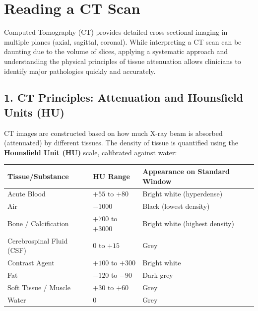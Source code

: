 \chapter{Reading a CT Scan}

\label{ch:read_ct}

Computed Tomography (CT) provides detailed cross-sectional imaging in multiple planes (axial, sagittal, coronal). While interpreting a CT scan can be daunting due to the volume of slices, applying a systematic approach and understanding the physical principles of tissue attenuation allows clinicians to identify major pathologies quickly and accurately.


\section*{1. CT Principles: Attenuation and Hounsfield Units (HU)}
CT images are constructed based on how much X-ray beam is absorbed (attenuated) by different tissues. The density of tissue is quantified using the \textbf{Hounsfield Unit (HU)} scale, calibrated against water:

\begin{center}
\begin{longtable}{@{}lll@{}}
\toprule
\textbf{Tissue/Substance} & \textbf{HU Range} & \textbf{Appearance on Standard Window} \\
\midrule
Acute Blood & $+55$ to $+80$ & Bright white (hyperdense) \\
Air & $-1000$ & Black (lowest density) \\
Bone / Calcification & $+700$ to $+3000$ & Bright white (highest density) \\
Cerebrospinal Fluid (CSF) & $0$ to $+15$ & Grey \\
Contrast Agent & $+100$ to $+300$ & Bright white \\
Fat & $-120$ to $-90$ & Dark grey \\
Soft Tissue / Muscle & $+30$ to $+60$ & Grey \\
Water & $0$ & Grey \\
\bottomrule
\end{longtable}
\end{center}

